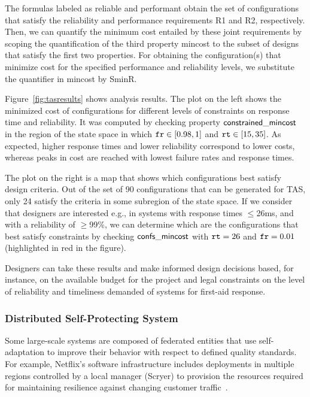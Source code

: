 \documentclass[10pt,journal,compsoc]{IEEEtran}
\begin{document}
The formulas labeled as {\sf reliable} and {\sf performant} obtain the set of configurations that satisfy the reliability and performance requirements {\sf R1} and {\sf R2}, respectively. 
Then, we can quantify the minimum cost entailed by these joint requirements by scoping the quantification of the third property {\sf mincost} to the subset of designs that satisfy the first two properties. 
For obtaining the configuration(s) that minimize cost for the specified performance and reliability levels, we substitute the quantifier in {\sf mincost} by {\sf SminR}.%




Figure~\ref{fig:tasresults} shows analysis results. 
The plot on the left shows the minimized cost of configurations for different levels of constraints on response time and reliability. It was computed by checking property ${\sf constrained\_mincost}$ in the region of the state space in which ${\tt fr} \in [0.98,1]$ and ${\tt rt} \in [15,35]$. 
As expected, higher response times and lower reliability correspond to lower costs, whereas peaks in cost are reached with lowest failure rates and response times.

The plot on the right is a map that shows which configurations best satisfy design criteria. 
Out of the set of 90 configurations that can be generated for TAS, only 24 satisfy the criteria in some subregion of the state space. 
If we consider that designers are interested e.g., in systems with response times  $\leq$26ms, and with a reliability of $\geq$99\%, we can determine which are the configurations that best satisfy constraints by checking ${\sf confs\_mincost}$ with ${\tt rt}=26$ and ${\tt fr}=0.01$ (highlighted in red in the figure).

Designers can take these results and make informed design decisions based, for instance, on the available budget for the project and legal constraints on the level of reliability and timeliness demanded of systems for first-aid response.

\subsubsection{Distributed Self-Protecting System}
\label{sec:cas}

Some large-scale systems are composed of federated entities that use self-adaptation to improve their behavior with respect to defined quality standards.
For example, Netflix's software infrastructure includes deployments in multiple regions controlled by a local manager (Scryer) to provision the resources required for maintaining resilience against changing customer traffic~\cite{meshenberg, jacobson}.
\end{document}
